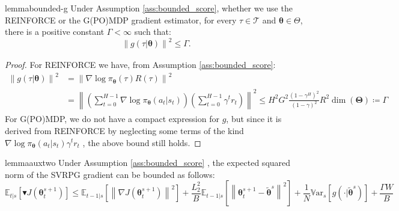 \documentclass{article}
\theoremstyle{remark}
\theoremstyle{definition}
\newcommand{\norm}[2][\infty]{\left\|#2\right\|_{#1}}
\newcommand{\vtheta}{\boldsymbol{\theta}}
\newcommand{\Tspace}{\mathcal{T}}
\newcommand{\score}[2]{\nabla\log\pi_{#1}(#2)}
\newcommand{\vTheta}{\boldsymbol{\Theta}}
\newcommand{\gradJ}[1]{\nabla J(#1)}
\newcommand{\Ets}[2][t]{\mathbb{E}_{#1\vert s}\left[#2\right]}
\newcommand{\Vars}[1]{{\mathbb{V}\text{ar}}_{s}\left[#1\right]}
\newcommand{\gradBlack}[1]{\blacktriangledown J(#1)}
\newcommand{\VARIS}{W}
\begin{document}
\begin{restatable}[]{lemma}{bounded-g}\label{lemma:gbound}
Under Assumption \ref{ass:bounded_score}, whether we use the REINFORCE or the G(PO)MDP gradient estimator, for every $\tau\in\Tspace$ and $\vtheta\in\Theta$, there is a positive constant $\Gamma<\infty$ such that:
\[
	\norm[]{g(\tau\vert\vtheta)}^2 \leq \Gamma.
\]
\end{restatable}
\begin{proof}
For REINFORCE we have, from Assumption \ref{ass:bounded_score}:
\begin{align*}
	\norm[]{g(\tau\vert\vtheta)}^2 &=
	\norm[]{\score{\vtheta}{\tau}R(\tau)}^2 \\
	&=\norm[]{\left(\sum_{t=0}^{H-1}\score{\vtheta}{a_t\vert s_t}\right)\left(\sum_{t=0}^{H-1}\gamma^t r_t\right)}^2\leq H^2G^2\frac{(1-\gamma^H)^2}{(1-\gamma)^2}R^2\dim(\vTheta) \coloneqq \Gamma
\end{align*}
For G(PO)MDP, we do not have a compact expression for $g$, but since it is derived from REINFORCE by neglecting some terms of the kind $\score{\vtheta}{a_t\vert s_t}\gamma^t r_t$ \cite{baxter2001infinite}\cite{peters2008reinforcement}, the above bound still holds.
\end{proof}
\begin{restatable}[]{lemma}{auxtwo}\label{lemma:aux2}
Under Assumption \ref{ass:bounded_score}
, the expected squared norm of the SVRPG gradient can be bounded as follows:
\[
\Ets{\gradBlack{\vtheta_t^{s+1}}} \leq
\Ets[t-1]{\norm[]{\gradJ{\vtheta_t^{s+1}}}^2} 
+\frac{L_2^2}{B}\Ets[t-1]{\norm[]{\vtheta_t^{s+1}-\tilde{\vtheta}^s}^2}
+\frac{1}{N}\Vars{g(\cdot\vert\tilde{\vtheta}^s)}
\nonumber 
+\frac{\Gamma\VARIS}{B}
\]
\end{restatable}
\end{document}
